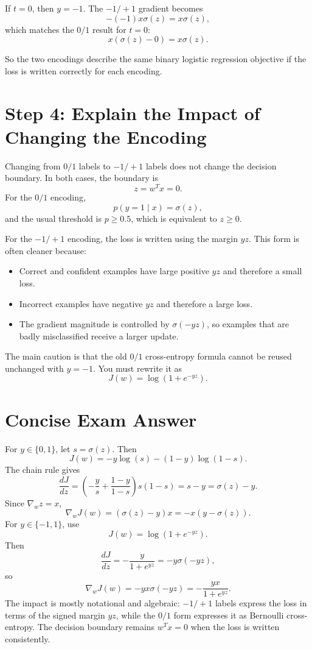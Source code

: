 \documentclass[11pt]{article}
\begin{document}
If $t=0$, then $y=-1$. The $-1/+1$ gradient becomes
\[
-(-1)x\sigma(z)=x\sigma(z),
\]
which matches the $0/1$ result for $t=0$:
\[
x(\sigma(z)-0)=x\sigma(z).
\]

So the two encodings describe the same binary logistic regression objective if the loss is written correctly for each encoding.

\section*{Step 4: Explain the Impact of Changing the Encoding}

Changing from $0/1$ labels to $-1/+1$ labels does not change the decision boundary. In both cases, the boundary is
\[
z=w^Tx=0.
\]
For the $0/1$ encoding,
\[
p(y=1\mid x)=\sigma(z),
\]
and the usual threshold is $p\ge 0.5$, which is equivalent to $z\ge 0$.

For the $-1/+1$ encoding, the loss is written using the margin $yz$. This form is often cleaner because:
\begin{itemize}
\item Correct and confident examples have large positive $yz$ and therefore a small loss.
\item Incorrect examples have negative $yz$ and therefore a large loss.
\item The gradient magnitude is controlled by $\sigma(-yz)$, so examples that are badly misclassified receive a larger update.
\end{itemize}

The main caution is that the old $0/1$ cross-entropy formula cannot be reused unchanged with $y=-1$. You must rewrite it as
\[
J(w)=\log(1+e^{-yz}).
\]

\section*{Concise Exam Answer}

For $y\in\{0,1\}$, let $s=\sigma(z)$. Then
\[
J(w)=-y\log(s)-(1-y)\log(1-s).
\]
The chain rule gives
\[
\frac{dJ}{dz}
=
\left(-\frac{y}{s}+\frac{1-y}{1-s}\right)s(1-s)
=s-y
=\sigma(z)-y.
\]
Since $\nabla_w z=x$,
\[
\nabla_w J(w)=(\sigma(z)-y)x=-x(y-\sigma(z)).
\]
For $y\in\{-1,1\}$, use
\[
J(w)=\log(1+e^{-yz}).
\]
Then
\[
\frac{dJ}{dz}=-\frac{y}{1+e^{yz}}=-y\sigma(-yz),
\]
so
\[
\nabla_wJ(w)=-yx\sigma(-yz)=-\frac{yx}{1+e^{yz}}.
\]
The impact is mostly notational and algebraic: $-1/+1$ labels express the loss in terms of the signed margin $yz$, while the $0/1$ form expresses it as Bernoulli cross-entropy. The decision boundary remains $w^Tx=0$ when the loss is written consistently.
\end{document}
